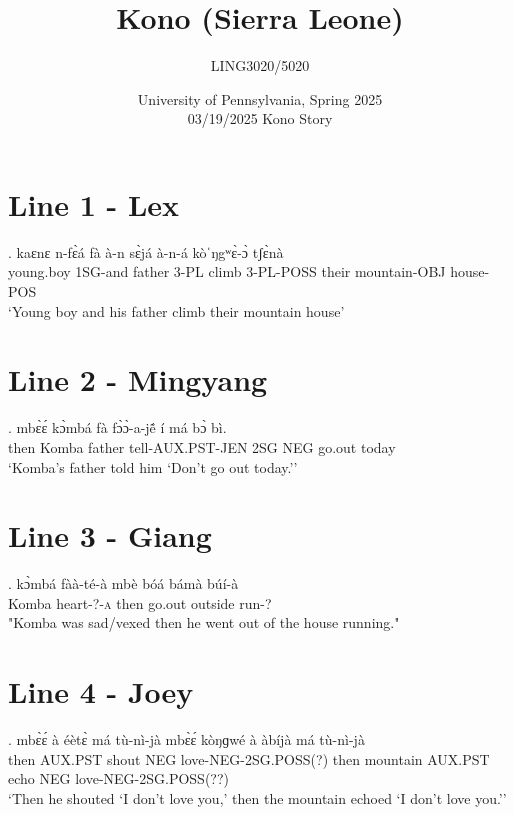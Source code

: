 \documentclass{assets/fieldnotes}
\title{Kono (Sierra Leone)}
\author{LING3020/5020}
\date{University of Pennsylvania, Spring 2025\\03/19/2025 Kono Story}
\begin{document}
\maketitle

\tableofcontents

\section{Line 1 - Lex} 
\exg.
kaɛnɛ n-fɛ̀á fà à-n sɛ̀já à-n-á kòˈŋgʷɛ̀-ɔ̀ tʃ⁠ɛ̀nà\\
young.boy 1SG-and father 3-PL climb 3-PL-POSS their mountain-OBJ house-POS\\
`Young boy and his father climb their mountain house'

\section{Line 2 - Mingyang} 
\exg. mbɛ̀ɛ́ kɔ̀mbá fà fɔ̀ɔ̀-a-jẽ́ í má bɔ̀ bì.\\
    then Komba father tell-AUX.PST-JEN 2SG NEG go.out today\\
    `Komba's father told him `Don't go out today.''

\section{Line 3 - Giang} 
\exg. kɔ̀mbá fàà-té-à mbè bóá bámà búí-à\\
Komba heart-?-\textsc{a} then go.out outside run-?\\
"Komba was sad/vexed then he went out of the house running."

\section{Line 4 - Joey} 

\exg. mbɛ̀ɛ́ à éètɛ̀ má tù-nì-jà mbɛ̀ɛ́ kòŋɡwé à àbíjà má tù-nì-jà\\
then AUX.PST shout NEG love-NEG-2SG.POSS(?) then mountain AUX.PST echo NEG love-NEG-2SG.POSS(??)\\
    `Then he shouted `I don't love you,' then the mountain echoed `I don't love you.''\\ 

\\
\end{document}
